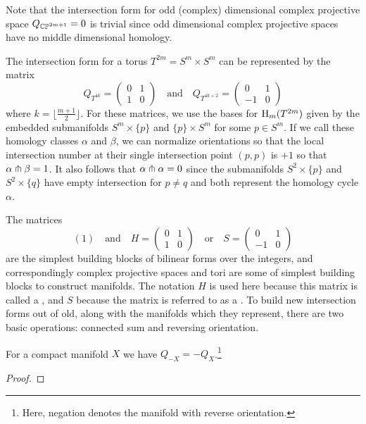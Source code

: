 Note that the intersection form for odd (complex) dimensional complex projective space $Q_{\mathbb{CP}^{2m+1}}=0$ is trivial since odd dimensional complex projective spaces have no middle dimensional homology.

\begin{example}\label{exam:intersection-form-torus}
	The intersection form for a torus $T^{2m}=S^m\times S^m$ can be represented by the matrix
	\[
		Q_{T^{4k}} = \begin{pmatrix}0 & 1 \\ 1 & 0\end{pmatrix}
		\quad\textrm{and}\quad
		Q_{T^{4k+2}} = \begin{pmatrix}0 & 1 \\ -1 & 0\end{pmatrix}
	\]
	where $k=\lfloor \frac{m+1}{2}\rfloor$. For these matrices, we use the bases for $\operatorname{H}_m(T^{2m})$ given by the embedded submanifolds $S^m\times \{p\}$ and $\{p\}\times S^m$ for some $p\in S^m$. If we call these homology classes $\alpha$ and $\beta$, we can normalize orientations so that the local intersection number at their single intersection point $(p,p)$ is $+1$ so that $\alpha\pitchfork \beta=1$. It also follows that $\alpha\pitchfork \alpha = 0$ since the submanifolds $S^2\times \{p\}$ and $S^2\times \{q\}$ have empty intersection for $p\neq q$ and both represent the homology cycle $\alpha$.
\end{example}

The matrices
\[
	(1)\quad\textrm{and}\quad H = \begin{pmatrix} 0 & 1 \\ 1 & 0\end{pmatrix}\quad\textrm{or}\quad S=\begin{pmatrix}0 & 1\\ -1 & 0\end{pmatrix}
\]
are the simplest building blocks of bilinear forms over the integers, and correspondingly complex projective spaces and tori are some of simplest building blocks to construct manifolds. The notation $H$ is used here because this matrix is called a , and $S$ because the matrix is referred to as a . To build new intersection forms out of old, along with the manifolds which they represent, there are two basic operations: connected sum and reversing orientation.

\begin{proposition}\label{prop:reverse-orientation-intersection-form}
	For a compact manifold $X$ we have $Q_{-X} = -Q_X$.\footnote{Here, negation denotes the manifold with reverse orientation.}
\end{proposition}
\begin{proof}
\end{proof}

